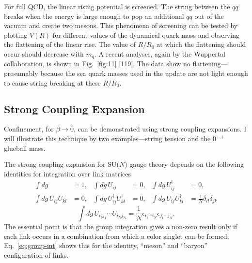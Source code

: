 For full QCD, the linear rising potential is screened. The string between
the $qq$ breaks when the energy is large enough to pop an additional $qq$
out of the vacuum and create two mesons. This phenomena of screening can
be tested by plotting $V(R)$ for different values of the dynamical quark
mass and observing the flattening of the linear rise. The value of $R/R_0$
at which the flattening should occur should decrease with $m_q$. A recent
analyses, again by the Wuppertal collaboration, is shown in
Fig.~\ref{fig:11} [119]. The data show no flattening---presumably because
the sea quark masses used in the update are not light enough to cause
string breaking at these $R/R_0$.

\subsection{Strong Coupling Expansion}
\label{sec:strong-coupling}

Confinement, for $\beta \to 0$, can be demonstrated using strong coupling
expansions. I will illustrate this technique by two examples---string
tension and the $0^{++}$ glueball mass.

The strong coupling expansion for SU($N$) gauge theory depends on the
following identities for integration over link matrices
\begin{align*}
  \int dg &= 1, &
  \int dg\, U_{ij} &= 0, &
  \int dg\, U_{ij}^\dagger &= 0, \\
  \int dg\, U_{ij} U_{kl} &= 0, &
  \int dg\, U_{ij}^\dagger U_{kl}^\dagger &= 0, &
  \int dg\, U_{ij} U_{kl}^\dagger &= \frac{1}{N}\delta_{il}\delta_{jk}
\end{align*}
\begin{equation}
  \int dg\, U_{i_1 j_1}\cdots U_{i_N j_N}
    = \frac{1}{N}\epsilon_{i_1\cdots i_N}\epsilon_{j_1\cdots j_N}.
  \label{eq:group-int}
\end{equation}
The essential point is that the group integration gives a non-zero result
only if each link occurs in a combination from which a color singlet can be
formed. Eq.~\eqref{eq:group-int} shows this for the identity, ``meson'' and
``baryon'' configuration of links.

